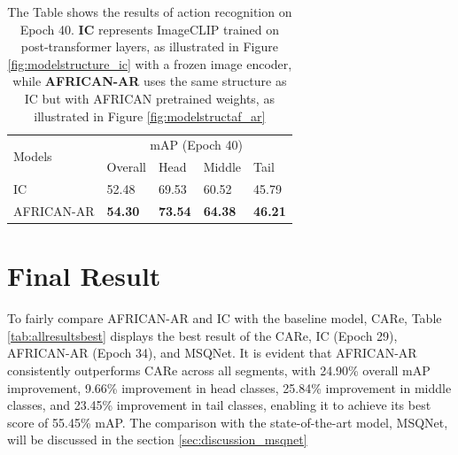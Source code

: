 \begin{table}[ht]
    \centering
    \caption[Results of action recognition (Epoch 40)]{The Table shows the results of action recognition on Epoch 40. \textbf{IC} represents ImageCLIP trained on post-transformer layers, as illustrated in Figure \ref{fig:modelstructure_ic} with a frozen image encoder, while \textbf{AFRICAN-AR} uses the same structure as IC but with AFRICAN pretrained weights, as illustrated in Figure \ref{fig:modelstructaf_ar}}
    \label{tab:allresults40}
    \begin{tabular}{lllll}
        \toprule
        \multirow{2}{*}{Models} & \multicolumn{4}{c}{mAP (Epoch 40)} \\
        \cmidrule{2-5} 
        {} & Overall & Head  & Middle & Tail \\
        \midrule
        IC            & 52.48   & 69.53 & 60.52 & 45.79 \\        
        AFRICAN-AR    & \textbf{54.30} & \textbf{73.54} & \textbf{64.38} & \textbf{46.21} \\
        \bottomrule
    \end{tabular}
\end{table}


\section{Final Result}
To fairly compare AFRICAN-AR and IC with the baseline model, CARe, Table \ref{tab:allresultsbest} displays the best result of the CARe, IC (Epoch 29), AFRICAN-AR (Epoch 34), and MSQNet. It is evident that AFRICAN-AR consistently outperforms CARe across all segments, with 24.90\% overall mAP improvement, 9.66\% improvement in head classes, 25.84\% improvement in middle classes, and 23.45\% improvement in tail classes, enabling it to achieve its best score of 55.45\% mAP. The comparison with the state-of-the-art model, MSQNet, will be discussed in the section \ref{sec:discussion_msqnet}

